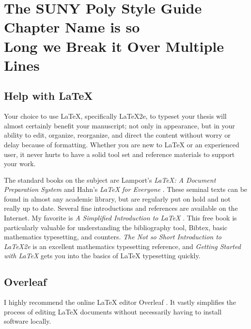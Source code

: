 
\chapter{The SUNY Poly Style Guide Chapter Name is so\\ 
         Long we Break it Over Multiple Lines\label{second}}  %

\section{Help with \LaTeX{}}

Your choice to use \LaTeX{}, specifically \LaTeX2e{}, to typeset your thesis will almost certainly 
benefit your manuscript; not only in appearance, but in your ability to edit,
organize, reorganize, and direct the content without worry or delay because of formatting.  Whether 
you are new to \LaTeX{} or an experienced user, it never hurts to have a solid tool set and reference
materials to support your work.  

The standard books on the subject are Lamport's \emph{\LaTeX{}: A Document Preparation System}
\cite{lamport_1994_latex} and Hahn's \emph{\LaTeX{} for Everyone} \cite{hahn_1993_latex}.
These seminal texts can be found in almost any academic library, but are regularly put on
hold and not really up to date.  Several fine introductions and references are available on the
Internet.  My favorite is \emph{A Simplified Introduction to {\LaTeX}} \cite{greenberg_2006_latex}.
This free book is particularly valuable for understanding the bibliography tool, Bibtex, 
basic mathematics typesetting, and counters.  \emph{The Not so Short Introduction to \LaTeX2e{}}
\cite{oetiker_2008_latex} is an excellent mathematics typesetting reference, 
and \emph{Getting Started with \LaTeX{}} \cite{wilkins_1995_latex} gets you into the basics of
\LaTeX{} typesetting quickly.

\section{Overleaf}
I highly recommend the online \LaTeX{} editor Overleaf \cite{overleafRef}.  It vastly simplifies the process of editing \LaTeX{} documents without necessarily having to install software locally.

